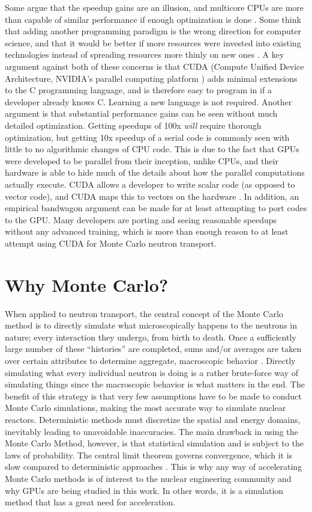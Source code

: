 Some argue that the speedup gains are an illusion, and multicore CPUs are more than capable of similar performance if enough optimization is done \cite{debunk}. Some think that adding another programming paradigm is the wrong direction for computer science, and that it would be better if more resources were invested into existing technologies instead of spreading resources more thinly on new ones \cite{fewer_lang}.  A key argument against both of these concerns is that CUDA (Compute Unified Device Architecture, NVIDIA's parallel computing platform \cite{cuda}) adds minimal extensions to the C programming language, and is therefore easy to program in if a developer already knows C.  Learning a new language is not required.  Another argument is that substantial performance gains can be seen without much detailed optimization.  Getting speedups of 100x \emph{will} require thorough optimization, but getting 10x speedup of a serial code is commonly seen with little to no algorithmic changes of CPU code.  This is due to the fact that GPUs were developed to be parallel from their inception, unlike CPUs, and their hardware is able to hide much of the details about how the parallel computations actually execute.  CUDA allows a developer to write scalar code (as opposed to vector code), and CUDA maps this to vectors on the hardware \cite{cuda}.  In addition, an empirical  bandwagon argument can be made for at least attempting to port codes to the GPU.  Many developers are porting and seeing reasonable speedups without any advanced training, which is more than enough reason to at least attempt using CUDA for Monte Carlo neutron transport. 

\section{Why Monte Carlo?}

When applied to neutron transport, the central concept of the Monte Carlo method is to directly simulate what  microscopically happens to the neutrons in nature; every interaction they undergo, from birth to death.  Once a sufficiently large number of these ``histories'' are completed, sums and/or averages are taken over certain attributes to determine aggregate, macroscopic behavior \cite{mcnp}.  Directly simulating what every individual neutron is doing is a rather brute-force way of simulating things since the macroscopic behavior is what matters in the end.   The benefit of this strategy is that very few assumptions have to be made to conduct Monte Carlo simulations, making the most accurate way to simulate nuclear reactors.  Deterministic methods must discretize the spatial and energy domains, inevitably leading to unavoidable inaccuracies.  The main drawback in using the Monte Carlo Method, however, is that statistical simulation and is subject to the laws of probability.  The central limit theorem governs convergence, which it is slow compared to deterministic approaches \cite{jaakko,openmc}.  This is why any way of accelerating Monte Carlo methods is of interest to the nuclear engineering community and why GPUs are being studied in this work.  In other words, it is a simulation method that has a great need for acceleration. 

